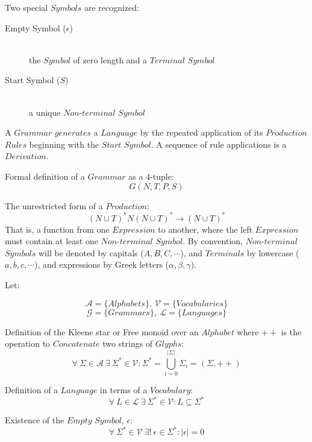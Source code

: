 \documentclass{article}
\begin{document}
Two special $Symbols$ are recognized:

    \begin{description}

    \item[Empty Symbol ($\epsilon$)] \hfill \\
    the $Symbol$ of zero length and a $Terminal$ $Symbol$

    \item[Start Symbol ($S$)] \hfill \\
    a unique $Non$-$terminal$ $Symbol$

    \end{description}

A $Grammar$ $generates$ a $Language$ by the repeated application of
its $Production$ $Rules$ beginning with the $Start$ $Symbol$. A
sequence of rule applications is a $Derivation$.

Formal definition of a $Grammar$ as a 4-tuple:
\[
    G(N,T,P,S)
\]

The unrestricted form of a $Production$:
\[
    (N \cup T)^*N(N \cup T)^* \rightarrow (N \cup T)^*
\]
That is, a function from one $Expression$ to another, where the left
$Expression$ must contain at least one $Non$-$terminal$ $Symbol$. By
convention, $Non$-$terminal$ $Symbols$ will be denoted by capitals
($A,B,C,\cdots$), and $Terminals$ by lowercase ($a,b,c,\cdots$), and
expressions by Greek letters ($\alpha,\beta,\gamma$).

Let:

\[
    \mathcal{A} = \{ Alphabets \},\: \mathcal{V} = \{ Vocabularies \}
\] \[
    \mathcal{G} = \{ Grammars \},\: \mathcal{L} = \{ Languages \}
\]

    \begin{description}

    \item Definition of the Kleene star or Free monoid over an
      $Alphabet$ where $++$ is the operation to $Concatenate$ two
      strings of $Glyphs$:
    \[
        \forall \: \Sigma \in \mathcal{A} \:
        \exists \: \Sigma^* \in \mathcal{V}
        : \Sigma^* = \bigcup_{i=0}^{|\Sigma|} \Sigma_i
        = (\Sigma,++)
    \]

    \item Definition of a $Language$ in terms of a $Vocabulary$:
    \[
        \forall \: L \in \mathcal{L} \:
        \exists \: \Sigma^* \in \mathcal{V}
        : L \subseteq \Sigma^*
    \]

    \item Existence of the $Empty$ $Symbol$, $\epsilon$:
    \[
        \forall \: \Sigma^* \in \mathcal{V} \:
        \exists ! \: \epsilon \in \Sigma^*
        : |\epsilon|=0
    \]

    \end{description}
\end{document}
